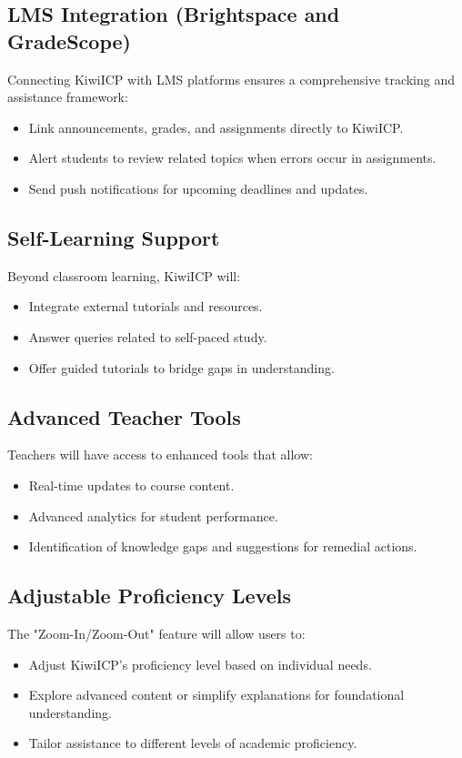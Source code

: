 \documentclass{article}
\begin{document}
\subsection{LMS Integration (Brightspace and GradeScope)}
Connecting KiwiICP with LMS platforms ensures a comprehensive tracking and assistance framework:
\begin{itemize}
    \item Link announcements, grades, and assignments directly to KiwiICP.
    \item Alert students to review related topics when errors occur in assignments.
    \item Send push notifications for upcoming deadlines and updates.
\end{itemize}

\subsection{Self-Learning Support}
Beyond classroom learning, KiwiICP will:
\begin{itemize}
    \item Integrate external tutorials and resources.
    \item Answer queries related to self-paced study.
    \item Offer guided tutorials to bridge gaps in understanding.
\end{itemize}

\subsection{Advanced Teacher Tools}
Teachers will have access to enhanced tools that allow:
\begin{itemize}
    \item Real-time updates to course content.
    \item Advanced analytics for student performance.
    \item Identification of knowledge gaps and suggestions for remedial actions.
\end{itemize}

\subsection{Adjustable Proficiency Levels}
The "Zoom-In/Zoom-Out" feature will allow users to:
\begin{itemize}
    \item Adjust KiwiICP's proficiency level based on individual needs.
    \item Explore advanced content or simplify explanations for foundational understanding.
    \item Tailor assistance to different levels of academic proficiency.
\end{itemize}
\end{document}
